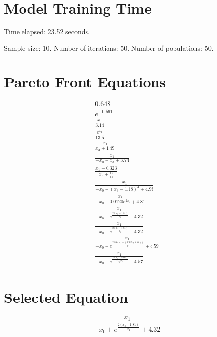 \documentclass{article}
\begin{document}
\section*{Model Training Time}
Time elapsed: 23.52 seconds.

Sample size: 10.
Number of iterations: 50.
Number of populations: 50.

\section*{Pareto Front Equations}
\begin{align*}
0.648 \\
e^{-0.561} \\
\frac{x_{1}}{3.14} \\
\frac{e^{x_{1}}}{13.5} \\
\frac{x_{1}}{x_{3} + 1.49} \\
\frac{x_{1}}{- x_{0} + x_{3} + 3.74} \\
\frac{x_{1} - 0.323}{x_{3} + \frac{x_{1}}{x_{0}}} \\
\frac{x_{1}}{- x_{0} + \left(x_{3} - 1.18\right)^{2} + 4.93} \\
\frac{x_{1}}{- x_{0} + 0.0120 e^{2 x_{3}} + 4.81} \\
\frac{x_{1}}{- x_{0} + e^{\frac{2 \left(x_{3} - 1.81\right)}{x_{1}}} + 4.32} \\
\frac{x_{1}}{- x_{0} + e^{\frac{2 \left(x_{3} - 1.81\right)}{x_{1}}} + 4.32} \\
\frac{x_{1}}{- x_{0} + e^{\frac{2.88 \left(x_{3} - \left(0.982 + 1.11\right)\right)}{x_{1}}} + 4.59} \\
\frac{x_{1}}{- x_{0} + e^{\frac{4 \left(x_{3} - 2.07\right)}{x_{1} \sqrt{x_{4}}}} + 4.57} \\
\end{align*}

\section*{Selected Equation}
\[ \frac{x_{1}}{- x_{0} + e^{\frac{2 \left(x_{3} - 1.81\right)}{x_{1}}} + 4.32} \]
\end{document}
